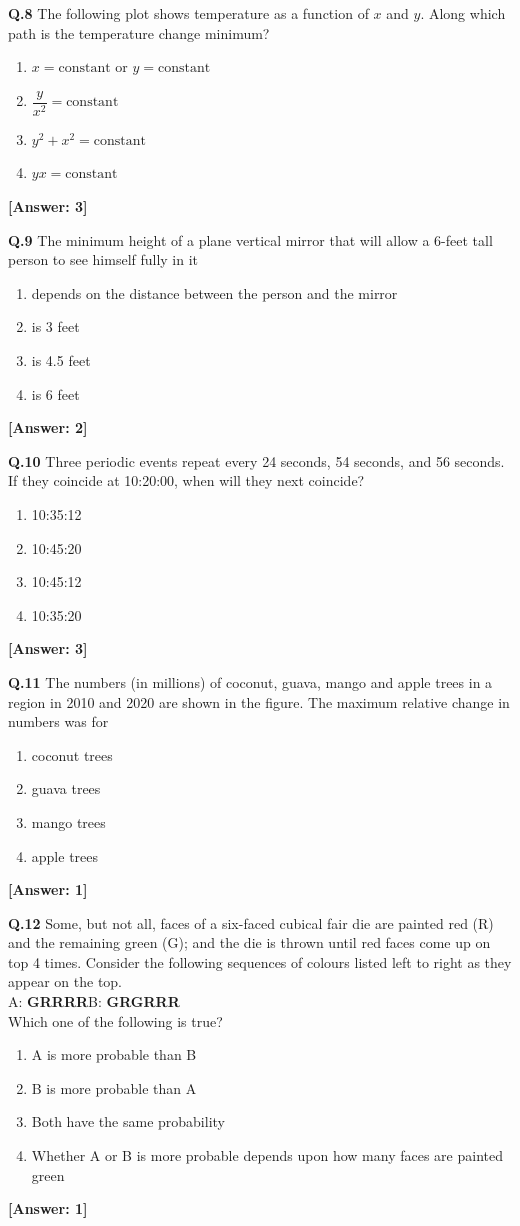 \documentclass[12pt,a4paper]{article}
\newcommand{\ans}[1]{\quad\textcolor{anscolor}{\textbf{[Answer: #1]}}}
\begin{document}
\textbf{Q.8} The following plot shows temperature as a function of $x$ and $y$. Along which path is the temperature change minimum?
\begin{enumerate}[label=\arabic*.]
\item $x=\text{constant}$ or $y=\text{constant}$
\item $\dfrac{y}{x^2}=\text{constant}$
\item $y^2+x^2=\text{constant}$
\item $yx=\text{constant}$
\end{enumerate}\ans{3}

\textbf{Q.9} The minimum height of a plane vertical mirror that will allow a 6-feet tall person to see himself fully in it
\begin{enumerate}[label=\arabic*.]
\item depends on the distance between the person and the mirror
\item is 3 feet \item is 4.5 feet \item is 6 feet
\end{enumerate}\ans{2}

\textbf{Q.10} Three periodic events repeat every 24 seconds, 54 seconds, and 56 seconds. If they coincide at 10:20:00, when will they next coincide?
\begin{enumerate}[label=\arabic*.]
\item 10:35:12 \item 10:45:20 \item 10:45:12 \item 10:35:20
\end{enumerate}\ans{3}

\textbf{Q.11} The numbers (in millions) of coconut, guava, mango and apple trees in a region in 2010 and 2020 are shown in the figure. The maximum relative change in numbers was for
\begin{enumerate}[label=\arabic*.]
\item coconut trees \item guava trees \item mango trees \item apple trees
\end{enumerate}\ans{1}

\textbf{Q.12} Some, but not all, faces of a six-faced cubical fair die are painted red (R) and the remaining green (G); and the die is thrown until red faces come up on top 4 times. Consider the following sequences of colours listed left to right as they appear on the top.\\
A: \textbf{GRRRR}\quad B: \textbf{GRGRRR}\\
Which one of the following is true?
\begin{enumerate}[label=\arabic*.]
\item A is more probable than B
\item B is more probable than A
\item Both have the same probability
\item Whether A or B is more probable depends upon how many faces are painted green
\end{enumerate}\ans{1}
\end{document}

